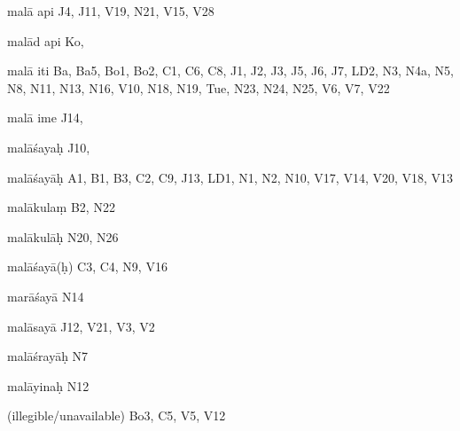 \begin{ekdosis}
\begin{marma}[hp01_055]
\begin{marma}[hp02_009]
\begin{marma}[hp02_011]
\begin{marma}[hp02_38a]
\begin{description}
        \end{description}
      \end{marma}

      \begin{marma}[hp02_38b]
      \item[malā api] J4, J11, V19, N21, V15, V28
      \item[malād api] Ko,
      \item[malā iti] Ba, Ba5, Bo1, Bo2, C1, C6, C8, J1, J2, J3, J5, J6, J7, LD2, N3, N4a, N5, N8, N11, N13, N16, V10, N18, N19, Tue, N23, N24, N25, V6, V7, V22
      \item[malā ime] J14, 
      \item[malāśayaḥ] J10,
      \item[malāśayāḥ] A1, B1, B3, C2, C9, J13, LD1, N1, N2, N10, V17, V14, V20, V18, V13
      \item[malākulaṃ] B2, N22
      \item[malākulāḥ] N20, N26
      \item[malāśayā(ḥ)] C3, C4, N9, V16
      \item[marāśayā] N14
      \item[malāsayā] J12, V21, V3, V2
      \item[malāśrayāḥ] N7
      \item[malāyinaḥ] N12
      \item[(illegible/unavailable)] Bo3, C5, V5, V12
        \begin{description}

        \end{description}
      \end{marma}

      \begin{marma}[hp02_39]
      \item[]
        \begin{description}

        \end{description}
      \end{marma}


\end{marma}
\end{marma}
\end{marma}
\end{ekdosis}
